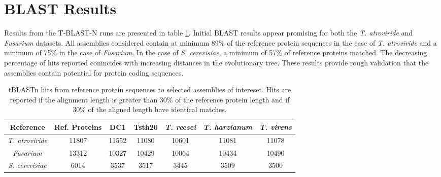 \section{BLAST Results}
Results from the T-BLAST-N runs are presented in table
\ref{table:tblastn}. Initial BLAST results appear promising for both
the \textit{T. atroviride} and \textit{Fusarium} datasets. All
assemblies considered contain at minimum 89\% of the reference protein
sequences in the case of \textit{T. atroviride} and a minimum of 75\%
in the case of \textit{Fusarium}. In the case of
\textit{S. cerevisiae}, a minimum of 57\% of reference proteins
matched. The decreasing percentage of hits reported conincides with
increasing distances in the evolutionary tree. These results provide
rough validation that the assemblies contain potential for protein
coding sequences.


\begin{table}
  \centering
  \begin{tabular}{|c|c|c|c|c|c|c|}
    \hline
    Reference & Ref. Proteins & DC1 & Tsth20 & \textit{T. reesei} & \textit{T. harzianum} & \textit{T. virens}  \\ \hline
    \textit{T. atroviride} & 11807 & 11552 & 11080 & 10601 & 11081 & 11078 \\ \hline 
    \textit{Fusarium} & 13312 & 10327 & 10429 & 10064 & 10434 & 10490 \\ \hline
    \textit{S. cerevisiae} & 6014 & 3537 & 3517 & 3445 & 3509 & 3500 \\ \hline
  \end{tabular}
  \caption{tBLASTn hits from reference protein sequences to selected
    assemblies of intereset. Hits are reported if the alignment length
    is greater than 30\% of the reference protein length and if 30\%
    of the aligned length have identical matches.}
  \label{table:tblastn}
\end{table}
